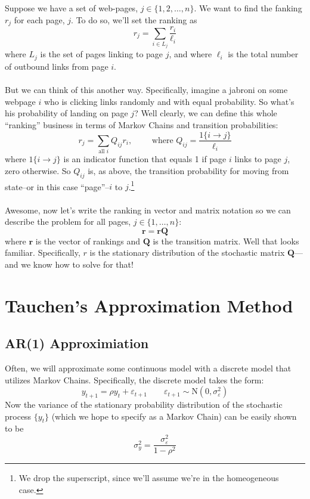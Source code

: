 \documentclass[12pt]{article}
\theoremstyle{plain}
\theoremstyle{definition}
\theoremstyle{remark}
\begin{document}
Suppose we have a set of web-pages, $j \in \{1, 2, \dots,n \}$.
We want to find the fanking $r_j$ for each page, $j$. To do 
so, we'll set the ranking as
    \[ r_j = \sum_{i \in L_j} \frac{r_i}{\ell_i} \]
where $L_j$ is the set of pages linking to page $j$, and
where $\ell_i$ is the total number of outbound links from 
page $i$. 
\\
\\
But we can think of this another way.  Specifically, imagine
a jabroni on some webpage $i$ who is clicking links randomly
and with equal probability.  So what's his probability of 
landing on page $j$?  Well clearly, we can define this whole
``ranking'' business in terms of Markov Chains and transition
probabilities:
    \[ r_j = \sum_{\text{all $i$}} Q_{ij} r_i, \qquad
	\text{ where  } Q_{ij} = \frac{1\{i \rightarrow j\}}{\ell_i}
    \]
where $1\{i \rightarrow j\}$ is an indicator function that 
equals 1 if page $i$ links to page $j$, zero otherwise.
So $Q_{ij}$ is, as above, the transition probability for
moving from state--or in this case ``page''--$i$ to 
$j$.\footnote{We drop the superscript, since we'll assume 
we're in the homeogeneous case.}
\\
\\
Awesome, now let's write the ranking in vector and matrix 
notation so we can describe the problem for all pages,
$j \in \{1, \ldots, n\}$:
    \[ \mathbf{r} = \mathbf{r} \mathbf{Q} \]
where $\mathbf{r}$ is the vector of rankings and $\mathbf{Q}$
is the transition matrix.  Well that looks familiar.  
Specifically, $r$ is the stationary distribution of the
stochastic matrix $\mathbf{Q}$---and we know how to solve for
that!


\newpage
\section{Tauchen's Approximation Method}

\subsection{AR(1) Approximiation}
Often, we will approximate some continuous model with a 
discrete model that utilizes Markov Chains. Specifically, the
discrete model takes the form:
\begin{equation}
    y_{t+1} = \rho y_t + \varepsilon_{t+1} \qquad 
	\varepsilon_{t+1} \sim \text{N}(0, \sigma_\varepsilon^2)
\end{equation}
Now the variance of the stationary probability distribution 
of the stochastic process $\{y_t\}$ (which we hope to specify
as a Markov Chain) can be easily shown to be
    \[ \sigma_y^2 = \frac{\sigma^2_\varepsilon}{1-\rho^2} \]
\end{document}
